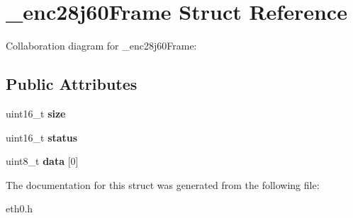 \hypertarget{struct__enc28j60Frame}{}\section{\+\_\+enc28j60\+Frame Struct Reference}
\label{struct__enc28j60Frame}


Collaboration diagram for \+\_\+enc28j60\+Frame\+:
\subsection*{Public Attributes}
\begin{DoxyCompactItemize}
\item 
\mbox{\label{struct__enc28j60Frame_a62cb7de85fcefe73e0ddb5006da221a7}} 
uint16\+\_\+t {\bfseries size}
\item 
\mbox{\label{struct__enc28j60Frame_a1833f4cb8b219df481491088095eb1d3}} 
uint16\+\_\+t {\bfseries status}
\item 
\mbox{\label{struct__enc28j60Frame_aba2c4ba29e5bced4008429f852c0a03a}} 
uint8\+\_\+t {\bfseries data} \mbox{[}0\mbox{]}
\end{DoxyCompactItemize}


The documentation for this struct was generated from the following file\+:\begin{DoxyCompactItemize}
\item 
eth0.\+h\end{DoxyCompactItemize}
